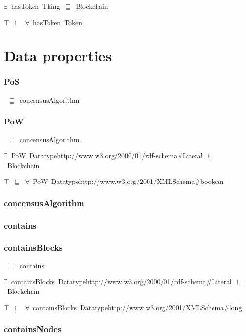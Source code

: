 \documentclass{article}
\begin{document}
\ensuremath{\exists}~hasToken~Thing~\ensuremath{\sqsubseteq}~Blockchain

\ensuremath{\top}~\ensuremath{\sqsubseteq}~\ensuremath{\forall}~hasToken~Token

\section*{Data properties}\subsubsection*{PoS}

~\ensuremath{\sqsubseteq}~concensusAlgorithm

\subsubsection*{PoW}

~\ensuremath{\sqsubseteq}~concensusAlgorithm

\ensuremath{\exists}~PoW~Datatypehttp://www.w3.org/2000/01/rdf-schema#Literal~\ensuremath{\sqsubseteq}~Blockchain

\ensuremath{\top}~\ensuremath{\sqsubseteq}~\ensuremath{\forall}~PoW~Datatypehttp://www.w3.org/2001/XMLSchema#boolean

\subsubsection*{concensusAlgorithm}

\subsubsection*{contains}

\subsubsection*{containsBlocks}

~\ensuremath{\sqsubseteq}~contains

\ensuremath{\exists}~containsBlocks~Datatypehttp://www.w3.org/2000/01/rdf-schema#Literal~\ensuremath{\sqsubseteq}~Blockchain

\ensuremath{\top}~\ensuremath{\sqsubseteq}~\ensuremath{\forall}~containsBlocks~Datatypehttp://www.w3.org/2001/XMLSchema#long

\subsubsection*{containsNodes}
\end{document}
